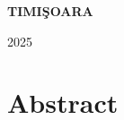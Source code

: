 \documentclass[12pt,a4paper]{book}
\theoremstyle{definition}
\theoremstyle{remark}
\begin{document}
\vfill
\begin{center}
{\bf TIMI\c SOARA

2025}
\end{center}

\newpage
\normalsize{}

\section*{Abstract} 


\newpage
\normalsize{}

\tableofcontents





% 



\end{document}
